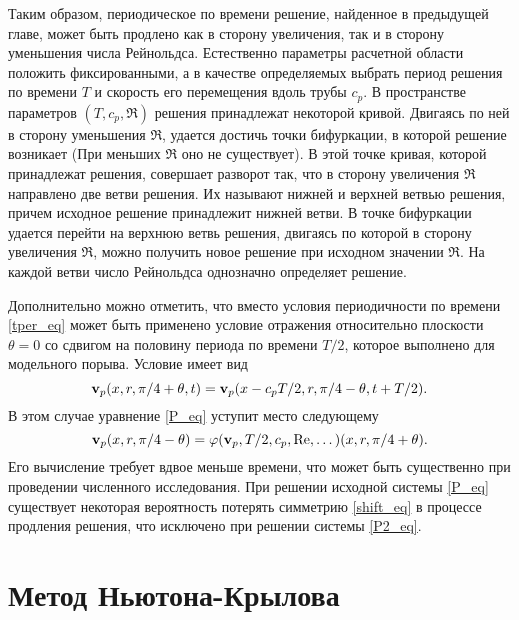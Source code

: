 Таким образом, периодическое по времени решение, найденное в предыдущей главе, может быть продлено как в сторону увеличения, так и в сторону уменьшения числа Рейнольдса. Естественно параметры расчетной области положить фиксированными, а в качестве определяемых выбрать период решения по времени $T$ и скорость его перемещения вдоль трубы $c_p$. В пространстве параметров $(T, c_p, \Re)$ решения принадлежат некоторой кривой. Двигаясь по ней в сторону уменьшения $\Re$, удается достичь точки бифуркации, в которой решение возникает (При меньших $\Re$ оно не существует). В этой точке кривая, которой принадлежат решения, совершает разворот так, что в сторону увеличения $\Re$ направлено две ветви решения. Их называют нижней и верхней ветвью решения, причем исходное решение принадлежит нижней ветви. В точке бифуркации удается перейти на верхнюю ветвь решения, двигаясь по которой в сторону увеличения $\Re$, можно получить новое решение при исходном значении $\Re$. На каждой ветви число Рейнольдса однозначно определяет решение. 

Дополнительно можно отметить, что вместо условия периодичности по времени \eqref{tper_eq} может быть применено условие отражения относительно плоскости $\theta = 0$ со сдвигом на половину периода по времени $T/2$, которое выполнено для модельного порыва. Условие имеет вид
\begin{equation}\label{shift_eq}
\mathbf{v}_p(x,r,\pi/4 + \theta,t) = \mathbf{v}_p(x - c_p T/2,r,\pi/4 - \theta,t+T/2).
\end{equation}
В этом случае уравнение \eqref{P_eq} уступит место следующему
\begin{equation}\label{P2_eq}
\mathbf{v}_p(x,r,\pi/4 - \theta) = \varphi(\mathbf{v}_p, T/2, c_p, \operatorname{Re}, \dots)(x,r,\pi/4 + \theta).
\end{equation}
Его вычисление требует вдвое меньше времени, что может быть существенно при проведении численного исследования. При решении исходной системы \eqref{P_eq} существует некоторая вероятность потерять симметрию \eqref{shift_eq} в процессе продления решения, что исключено при решении системы \eqref{P2_eq}.


\section{Метод Ньютона-Крылова} \label{Newton_seq}

